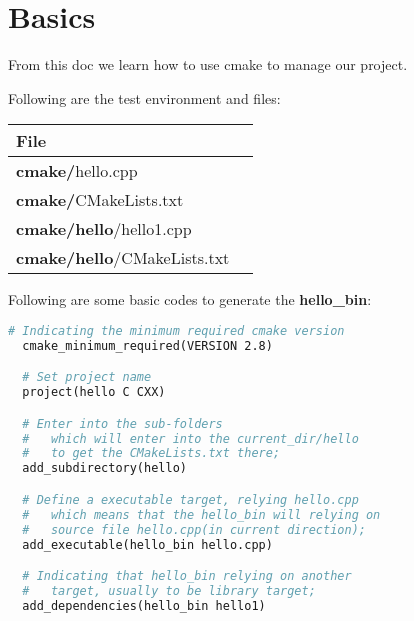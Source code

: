 \documentclass[11pt]{article}
\begin{document}
\maketitle

\Large

\clearpage
\section{Basics}%
\label{sec:basics}

From this doc we learn how to use cmake to manage our project.

\vspace{1cm}

Following are the test environment and files:

\begin{center}
  \begin{tabular}{|l|l|}
    \hline
      \textbf{File} & \textbf{}\\
    \hline
      \textbf{cmake/}hello.cpp &  \\
    \hline
      \textbf{cmake/}CMakeLists.txt &  \\
    \hline
      \textbf{cmake/}\textbf{hello}/hello1.cpp &   \\
    \hline
      \textbf{cmake/}\textbf{hello}/CMakeLists.txt &  \\
    \hline
  \end{tabular}
\end{center}


Following are some basic codes to generate the \textbf{hello\_bin}:
\begin{lstlisting}[language=make,label=lst:1lst,caption=Frame of the \textbf{cmake/CMakeLists.txt}]
  # Indicating the minimum required cmake version
  cmake_minimum_required(VERSION 2.8)

  # Set project name
  project(hello C CXX)

  # Enter into the sub-folders 
  #   which will enter into the current_dir/hello 
  #   to get the CMakeLists.txt there;
  add_subdirectory(hello)

  # Define a executable target, relying hello.cpp
  #   which means that the hello_bin will relying on
  #   source file hello.cpp(in current direction);
  add_executable(hello_bin hello.cpp) 

  # Indicating that hello_bin relying on another 
  #   target, usually to be library target;
  add_dependencies(hello_bin hello1)
\end{lstlisting}
\end{document}

